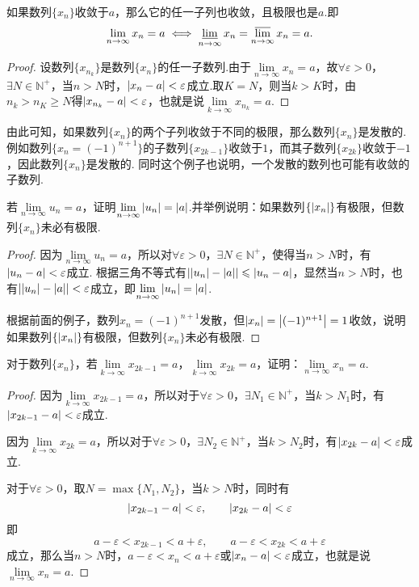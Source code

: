 \begin{theorem}[收敛数列与其子列的关系]
如果数列\(\{x_n\}\)收敛于\(a\)，那么它的任一子列也收敛，且极限也是\(a\).即\[
\lim\limits_{n\to\infty} x_n = a
\iff
\varliminf\limits_{n\to\infty} x_n = \varlimsup\limits_{n\to\infty} x_n = a.
\]
\begin{proof}
设数列\(\{x_{n_k}\}\)是数列\(\{x_n\}\)的任一子数列.由于\(\lim\limits_{n\to\infty}x_n = a\)，故\(\forall \varepsilon > 0\)，\(\exists N \in \mathbb{N}^+\)，当\(n > N\)时，\(\abs{x_n - a} < \varepsilon\)成立.取\(K = N\)，则当\(k > K\)时，由\(n_k > n_K \geqslant N\)得\(\abs{x_{n_k} - a} < \varepsilon\)，也就是说\(\lim\limits_{k\to\infty}x_{n_k} = a\).
\end{proof}
\end{theorem}
由此可知，如果数列\(\{x_n\}\)的两个子列收敛于不同的极限，那么数列\(\{x_n\}\)是发散的.
例如数列\(\{x_n=(-1)^{n+1}\}\)的子数列\(\{x_{2k-1}\}\)收敛于\(1\)，而其子数列\(\{x_{2k}\}\)收敛于\(-1\)，因此数列\(\{x_n\}\)是发散的.
同时这个例子也说明，一个发散的数列也可能有收敛的子数列.

\begin{example}
\def\l{\lim\limits_{n\to\infty}}
若\(\l u_n = a\)，证明\(\l \abs{u_n} = \abs{a}\).并举例说明：如果数列\(\{\abs{x_n}\}\)有极限，但数列\(\{x_n\}\)未必有极限.
\begin{proof}
因为\(\l u_n = a\)，所以对\(\forall\varepsilon>0\)，\(\exists N \in \mathbb{N}^+\)，使得当\(n>N\)时，有\(\abs{u_n-a}<\varepsilon\)成立.
根据三角不等式有\(\abs{\abs{u_n}-\abs{a}} \leqslant \abs{u_n-a}\)，显然当\(n>N\)时，也有\(\abs{\abs{u_n}-\abs{a}}<\varepsilon\)成立，即\(\l \abs{u_n} = \abs{a}\).

根据前面的例子，数列\(x_n = (-1)^{n+1}\)发散，但\(\abs{x_n} = \abs{(-1)^{n+1}} = 1\)收敛，说明如果数列\(\{\abs{x_n}\}\)有极限，但数列\(\{x_n\}\)未必有极限.
\end{proof}
\end{example}

\begin{example}
\def\l#1{\lim\limits_{#1\to\infty}}
对于数列\(\{x_n\}\)，若\(\l{k}x_{2k-1}=a\)，\(\l{k}x_{2k}=a\)，证明：\(\l{n}x_n=a\).
\begin{proof}
因为\(\l{k}x_{2k-1}=a\)，所以对于\(\forall\varepsilon>0\)，\(\exists N_1 \in \mathbb{N}^+\)，当\(k>N_1\)时，有\(\abs{x_{2k-1}-a}<\varepsilon\)成立.

因为\(\l{k}x_{2k}=a\)，所以对于\(\forall\varepsilon>0\)，\(\exists N_2 \in \mathbb{N}^+\)，当\(k>N_2\)时，有\(\abs{x_{2k}-a}<\varepsilon\)成立.

对于\(\forall\varepsilon>0\)，取\(N = \max\{N_1,N_2\}\)，当\(k>N\)时，同时有\[
\abs{x_{2k-1}-a}<\varepsilon, \qquad \abs{x_{2k}-a}<\varepsilon
\]即\[
a-\varepsilon<x_{2k-1}<a+\varepsilon, \qquad a-\varepsilon<x_{2k}<a+\varepsilon
\]成立，那么当\(n>N\)时，\(a-\varepsilon<x_n<a+\varepsilon\)或\(\abs{x_n-a}<\varepsilon\)成立，也就是说\(\l{n}x_n=a\).
\end{proof}
\end{example}

